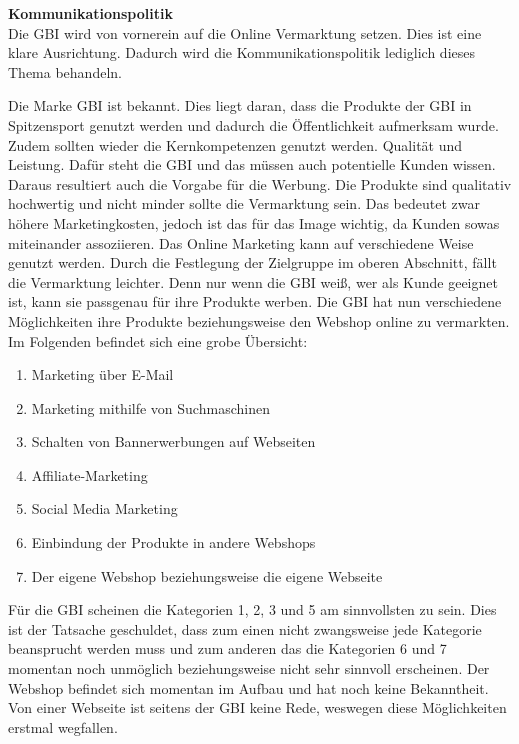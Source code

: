 \small{\textbf{Kommunikationspolitik}}\\
Die GBI wird von vornerein auf die Online Vermarktung setzen. Dies ist eine klare Ausrichtung. Dadurch wird die Kommunikationspolitik lediglich dieses Thema behandeln.

Die Marke GBI ist bekannt. Dies liegt daran, dass die Produkte der GBI in Spitzensport genutzt werden und dadurch die Öffentlichkeit aufmerksam wurde. Zudem sollten wieder die Kernkompetenzen genutzt werden. Qualität und Leistung. Dafür steht die GBI und das müssen auch potentielle Kunden wissen. Daraus resultiert auch die Vorgabe für die Werbung. Die Produkte sind qualitativ hochwertig und nicht minder sollte die Vermarktung sein. Das bedeutet zwar höhere Marketingkosten, jedoch ist das für das Image wichtig, da Kunden sowas miteinander assoziieren. Das Online Marketing kann auf verschiedene Weise genutzt werden. Durch die Festlegung der Zielgruppe im oberen Abschnitt, fällt die Vermarktung leichter. Denn nur wenn die GBI weiß, wer als Kunde geeignet ist, kann sie passgenau für ihre Produkte werben. Die GBI hat nun verschiedene Möglichkeiten ihre Produkte beziehungsweise den Webshop online zu vermarkten. Im Folgenden befindet sich eine grobe Übersicht:
\begin{enumerate}
	\item Marketing über E-Mail
	\item Marketing mithilfe von Suchmaschinen
	\item Schalten von Bannerwerbungen auf Webseiten
	\item Affiliate-Marketing
	\item Social Media Marketing
	\item Einbindung der Produkte in andere Webshops
	\item Der eigene Webshop beziehungsweise die eigene Webseite
\end{enumerate}

Für die GBI scheinen die Kategorien 1, 2, 3 und 5 am sinnvollsten zu sein. Dies ist der Tatsache geschuldet, dass zum einen nicht zwangsweise jede Kategorie beansprucht werden muss und zum anderen das die Kategorien 6 und 7 momentan noch unmöglich beziehungsweise nicht sehr sinnvoll erscheinen. Der Webshop befindet sich momentan im Aufbau und hat noch keine Bekanntheit. Von einer Webseite ist seitens der GBI keine Rede, weswegen diese Möglichkeiten erstmal wegfallen.

